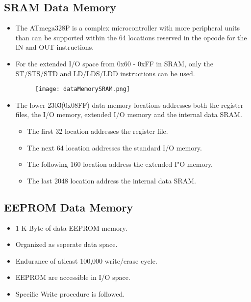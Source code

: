 \documentclass{article}
\begin{document}
\subsection{SRAM Data Memory}
\begin{itemize}
    \item The ATmega328P is a complex microcontroller with more peripheral units than can be supported within the 64 locations reserved in the opcode for the IN and OUT instructions.
    \item For the extended I/O space from 0x60 - 0xFF in SRAM, only the ST/STS/STD and LD/LDS/LDD instructions can be used.
          \begin{figure}[H]
              \begin{center}
                  \texttt{[image: dataMemorySRAM.png]}
              \end{center}
          \end{figure}
    \item The lower 2303(0x08FF) data memory locations addresses both the register files, the I/O memory, extended I/O memory and the internal data SRAM.
          \begin{itemize}
              \item The first 32 location addresses the register file.
              \item The next 64 location addresses the standard I/O memory.
              \item The following 160 location address the extended I"O memory.
              \item The last 2048 location address the internal data SRAM.
          \end{itemize}
\end{itemize}

\subsection{EEPROM Data Memory}
\begin{itemize}
    \item 1 K Byte of data EEPROM memory.
    \item Organized as seperate data space.
    \item Endurance of atleast 100,000 write/erase cycle.
    \item EEPROM are accessible in I/O space.
    \item Specific Write procedure is followed.
\end{itemize}
\end{document}
